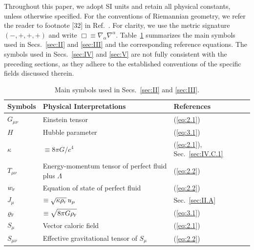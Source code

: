 \documentclass[aps,prd,twocolumn]{revtex4-2}
\newcommand\subF{\textsc{f}}
\begin{document}
Throughout this paper, we adopt SI units and retain all physical constants, unless otherwise specified. For the conventions of Riemannian geometry, we refer the reader to footnote [32] in Ref.~\cite{Tian2023.PRD.107.103507}. For clarity, we use the metric signature $(-,+,+,+)$ and write $\Box\equiv\nabla_\alpha\nabla^\alpha$. Table~\ref{tab:01} summarizes the main symbols used in Secs.~\ref{sec:II} and \ref{sec:III} and the corresponding reference equations. The symbols used in Secs.~\ref{sec:IV} and \ref{sec:V} are not fully consistent with the preceding sections, as they adhere to the established conventions of the specific fields discussed therein.

\begin{table}[!t]
  \centering
  \begin{minipage}{0.88\textwidth}
  \caption{Main symbols used in Secs.~\ref{sec:II} and \ref{sec:III}.}
  \label{tab:01}
  \begin{tabular*}{\hsize}{@{\ \ }@{\extracolsep{\fill}}lll@{\ \ }}
    \hline\hline
    Symbols                     &  Physical Interpretations                                &  References  \\
    \hline
    $G_{\mu\nu}$                &  Einstein tensor                                         &  (\ref{eq:2.1})  \\
    $H$                         &  Hubble parameter                                        &  (\ref{eq:3.1})  \\
    $\kappa$                    &  $\equiv8\pi G/c^4$                                      &  (\ref{eq:2.1}), Sec.~\ref{sec:IV.C.1}  \\
    \hline
    $T_{\mu\nu}$                &  Energy-momentum tensor of perfect fluid plus $\Lambda$  &  (\ref{eq:2.2})  \\
    $w_\subF$                   &  Equation of state of perfect fluid                      &  (\ref{eq:2.2})  \\
    $J_\mu$                     &  $\equiv\sqrt{\kappa\rho_\subF}\,u_\mu$                  &  Sec.~\ref{sec:II.A}  \\[0.3mm]
    $\varrho_\subF$             &  $\equiv\displaystyle\sqrt{8\pi G\rho_\subF}$            &  (\ref{eq:3.1})  \\[0.1mm]
    \hline
    $S_\mu$                     &  Vector caloric field                                    &  (\ref{eq:2.1})  \\
    $S_{\mu\nu}$                &  Effective gravitational tensor of $S_\mu$               &  (\ref{eq:2.2})  \\

\end{tabular*}
\end{minipage}
\end{table}
\end{document}
